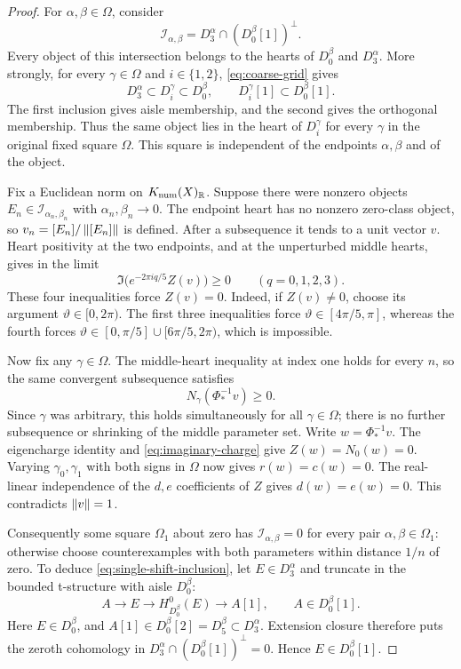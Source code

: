\begin{proof}
For $\alpha,\beta\in\Omega$, consider
\[
 \mathcal I_{\alpha,\beta}
   =D_3^\alpha\cap(D_0^\beta[1])^\perp.
\]
Every object of this intersection belongs to the hearts of $D_0^\beta$
and $D_3^\alpha$.  More strongly, for every $\gamma\in\Omega$ and
$i\in\{1,2\}$, \eqref{eq:coarse-grid} gives
\[
 D_3^\alpha\subset D_i^\gamma\subset D_0^\beta,
 \qquad D_i^\gamma[1]\subset D_0^\beta[1].
\]
The first inclusion gives aisle membership, and the second gives the
orthogonal membership.  Thus the same object lies in the heart of
$D_i^\gamma$ for every $\gamma$ in the original fixed square $\Omega$.
This square is independent of the endpoints $\alpha,\beta$ and of the
object.

Fix a Euclidean norm on $K_{\mathrm{num}}(X)_\mathbb R$.  Suppose there were nonzero
objects $E_n\in\mathcal I_{\alpha_n,\beta_n}$ with
$\alpha_n,\beta_n\longrightarrow0$.  The endpoint heart has no nonzero
zero-class object, so
$v_n=[E_n]/\left\lVert[E_n]\right\rVert$ is defined.  After a subsequence it tends to a
unit vector $v$.  Heart positivity at the two endpoints, and at the
unperturbed middle hearts, gives in the limit
\begin{equation}\label{eq:four-halfplanes}
 \Im\bigl(e^{-2\pi i q/5}Z(v)\bigr)\ge0
 \qquad(q=0,1,2,3).
\end{equation}
These four inequalities force $Z(v)=0$.  Indeed, if $Z(v)\ne0$, choose its
argument $\vartheta\in[0,2\pi)$.  The first three inequalities force
$\vartheta\in[4\pi/5,\pi]$, whereas the fourth forces
$\vartheta\in[0,\pi/5]\cup[6\pi/5,2\pi)$, which is impossible.

Now fix any $\gamma\in\Omega$.  The middle-heart inequality at index one
holds for every $n$, so the same convergent subsequence satisfies
\[
 N_\gamma(\Phi_*^{-1}v)\ge0.
\]
Since $\gamma$ was arbitrary, this holds simultaneously for all
$\gamma\in\Omega$; there is no further subsequence or shrinking of the
middle parameter set.  Write $w=\Phi_*^{-1}v$.  The eigencharge identity
and \eqref{eq:imaginary-charge} give $Z(w)=N_0(w)=0$.  Varying
$\gamma_0,\gamma_1$ with both signs in $\Omega$ now gives
$r(w)=c(w)=0$.  The real-linear independence of the $d,e$ coefficients
of $Z$ gives $d(w)=e(w)=0$.  This contradicts $\left\lVert v\right\rVert=1$.

Consequently some square $\Omega_1$ about zero has
$\mathcal I_{\alpha,\beta}=0$ for every pair
$\alpha,\beta\in\Omega_1$: otherwise choose counterexamples with both
parameters within distance $1/n$ of zero.  To deduce
\eqref{eq:single-shift-inclusion}, let $E\in D_3^\alpha$ and truncate in
the bounded t-structure with aisle $D_0^\beta$:
\[
 A\longrightarrow E\longrightarrow H^0_{D_0^\beta}(E)
   \longrightarrow A[1],\qquad A\in D_0^\beta[1].
\]
Here $E\in D_0^\beta$, and
$A[1]\in D_0^\beta[2]=D_5^\beta\subset D_3^\alpha$.
Extension closure therefore puts the zeroth cohomology in
$D_3^\alpha\cap(D_0^\beta[1])^\perp=0$.  Hence $E\in D_0^\beta[1]$.


\end{proof}
